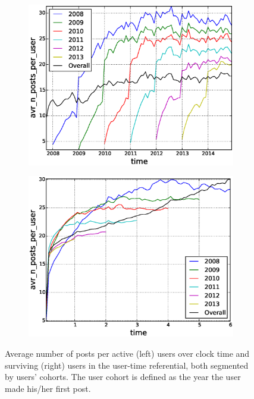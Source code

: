 \begin{figure}[!tb]
\centering
\begin{subfigure}{.49\textwidth}\includegraphics[scale=0.4]{./images/avr_posts_per_user_over_time_cohorts.eps}\caption{}\end{subfigure}
\begin{subfigure}{.49\textwidth}\includegraphics[scale=0.4]{./images/avr_posts_per_user_cohorts.eps}\caption{}\end{subfigure}
\caption{Average number of posts per active (left) users over clock time and surviving (right) users in the user-time referential, both segmented by users' cohorts. The user cohort is defined as the year the user made his/her first post.}
\label{fig:avr_posts_per_user_over_time_cohorts}
\end{figure}

